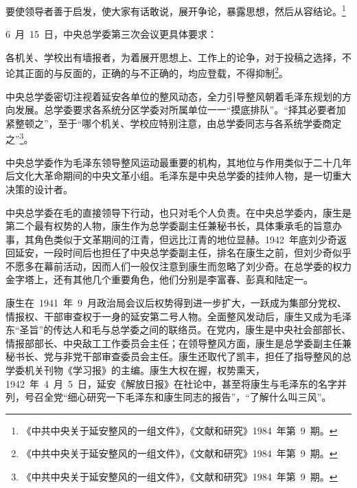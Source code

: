 \begin{quoting}
要使领导者善于启发，使大家有话敢说，展开争论，暴露思想，然后从容结论。\footnote{《中共中央关于延安整风的一组文件》，《文献和研究》1984~年第~9~期。}
\end{quoting}6~月~15~日，中央总学委第三次会议更具体要求：

\begin{quoting}
各机关、学校出有墙报者，为着展开思想上、工作上的论争，对于投稿之选择，不论其正面的与反面的，正确的与不正确的，均应登载，不得抑制\footnote{《中共中央关于延安整风的一组文件》，《文献和研究》1984~年第~9~期。}。
\end{quoting}中央总学委密切注视着延安各单位的整风动态，全力引导整风朝着毛泽东规划的方向发展。总学委要求各系统分区学委对所属单位一一“摸底排队”。“择其必要者加紧整顿之”，至于“哪个机关、学校应特别注意，由总学委同志与各系统学委商定之”\footnote{《中共中央关于延安整风的一组文件》，《文献和研究》1984~年第~9~期。}。

中央总学委作为毛泽东领导整风运动最重要的机构，其地位与作用类似于二十几年后文化大革命期间的中央文革小组。毛泽东是中央总学委的挂帅人物，是一切重大决策的设计者。

中央总学委在毛的直接领导下行动，也只对毛个人负责。在中央总学委内，康生是第二个最有权势的人物，康生作为总学委副主任兼秘书长，具体秉承毛的旨意办事，其角色类似于文革期间的江青，但远比江青的地位显赫。1942~年底刘少奇返回延安，一段时间后也担任了中央总学委副主任，排名在康生之前，但刘少奇似乎不愿多在幕前活动，因而人们一般仅注意到康生而忽略了刘少奇。在总学委的权力金字塔上，还有其他几个重要角色，他们分别是李富春、彭真和陆定一。

康生在~1941~年~9~月政治局会议后权势得到进一步扩大，一跃成为集部分党权、情报权、干部审查权于一身的延安第二号人物。全面整风发动后，康生又成为毛泽东“圣旨”的传达人和毛与总学委之间的联络员。在党内，康生是中央社会部部长、情报部部长、中央敌工工作委员会主任；在领导整风方面，康生是总学委副主任兼秘书长、党与非党干部审查委员会主任。康生还取代了凯丰，担任了指导整风的总学委机关刊物《学习报》的主编。康生大权在握，权势熏天，1942~年~4~月~5~日，延安《解放日报》在社论中，甚至将康生与毛泽东的名字并列，号召全党“细心研究一下毛泽东和康生同志的报告”，“了解什么叫三风”。

